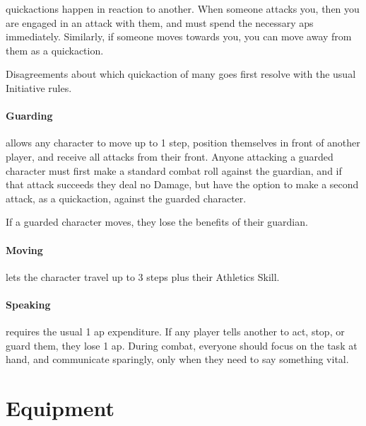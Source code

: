 \begin{multicols}{2}
\Glspl{quickaction} happen in reaction to another.
When someone attacks you, then you are engaged in an attack with them, and must spend the necessary \glspl{ap} immediately.
Similarly, if someone moves towards you, you can move away from them as a \gls{quickaction}.

Disagreements about which \gls{quickaction} of many goes first resolve with the usual Initiative rules.

\paragraph{Guarding}
allows any character to move up to 1 \gls{step}, position themselves in front of another player, and receive all attacks from their front.
Anyone attacking a guarded character must first make a standard combat roll against the guardian, and if that attack succeeds they deal no Damage, but have the option to make a second attack, as a \gls{quickaction}, against the guarded character.

If a guarded character moves, they lose the benefits of their guardian.

\paragraph{Moving}
lets the character travel up to 3 steps plus their Athletics Skill.

\paragraph{Speaking}
requires the usual 1 \gls{ap} expenditure.
If any player tells another to act, stop, or guard them, they lose 1 \gls{ap}.
During combat, everyone should focus on the task at hand, and communicate sparingly, only when they need to say something vital.

\end{multicols}

\section{Equipment}

